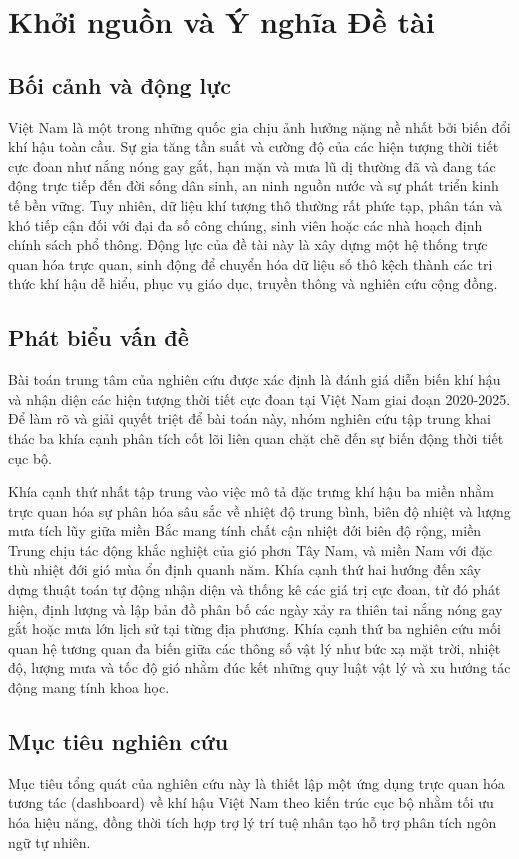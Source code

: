 \chapter{Khởi nguồn và Ý nghĩa Đề tài}

\section{Bối cảnh và động lực}
Việt Nam là một trong những quốc gia chịu ảnh hưởng nặng nề nhất bởi biến đổi khí hậu toàn cầu. Sự gia tăng tần suất và cường độ của các hiện tượng thời tiết cực đoan như nắng nóng gay gắt, hạn mặn và mưa lũ dị thường đã và đang tác động trực tiếp đến đời sống dân sinh, an ninh nguồn nước và sự phát triển kinh tế bền vững. Tuy nhiên, dữ liệu khí tượng thô thường rất phức tạp, phân tán và khó tiếp cận đối với đại đa số công chúng, sinh viên hoặc các nhà hoạch định chính sách phổ thông. Động lực của đề tài này là xây dựng một hệ thống trực quan hóa trực quan, sinh động để chuyển hóa dữ liệu số thô kệch thành các tri thức khí hậu dễ hiểu, phục vụ giáo dục, truyền thông và nghiên cứu cộng đồng.

\section{Phát biểu vấn đề}
Bài toán trung tâm của nghiên cứu được xác định là đánh giá diễn biến khí hậu và nhận diện các hiện tượng thời tiết cực đoan tại Việt Nam giai đoạn 2020-2025. Để làm rõ và giải quyết triệt để bài toán này, nhóm nghiên cứu tập trung khai thác ba khía cạnh phân tích cốt lõi liên quan chặt chẽ đến sự biến động thời tiết cục bộ.

Khía cạnh thứ nhất tập trung vào việc mô tả đặc trưng khí hậu ba miền nhằm trực quan hóa sự phân hóa sâu sắc về nhiệt độ trung bình, biên độ nhiệt và lượng mưa tích lũy giữa miền Bắc mang tính chất cận nhiệt đới biên độ rộng, miền Trung chịu tác động khắc nghiệt của gió phơn Tây Nam, và miền Nam với đặc thù nhiệt đới gió mùa ổn định quanh năm. Khía cạnh thứ hai hướng đến xây dựng thuật toán tự động nhận diện và thống kê các giá trị cực đoan, từ đó phát hiện, định lượng và lập bản đồ phân bố các ngày xảy ra thiên tai nắng nóng gay gắt hoặc mưa lớn lịch sử tại từng địa phương. Khía cạnh thứ ba nghiên cứu mối quan hệ tương quan đa biến giữa các thông số vật lý như bức xạ mặt trời, nhiệt độ, lượng mưa và tốc độ gió nhằm đúc kết những quy luật vật lý và xu hướng tác động mang tính khoa học.

\section{Mục tiêu nghiên cứu}
Mục tiêu tổng quát của nghiên cứu này là thiết lập một ứng dụng trực quan hóa tương tác (dashboard) về khí hậu Việt Nam theo kiến trúc cục bộ nhằm tối ưu hóa hiệu năng, đồng thời tích hợp trợ lý trí tuệ nhân tạo hỗ trợ phân tích ngôn ngữ tự nhiên.

